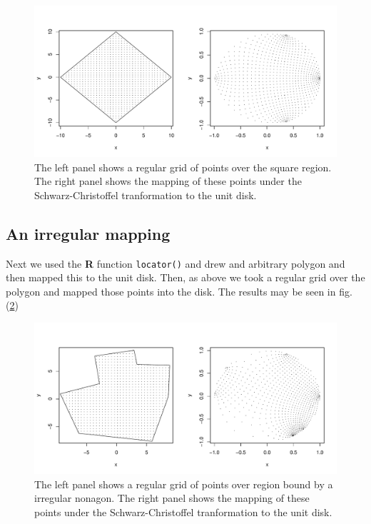 \documentclass[a4paper,10pt]{amsart}
\newcommand{\sch}{Schwarz-Christoffel }
\begin{document}
\begin{figure} [bp]
\centering
\includegraphics[scale=0.5]{figs/squaredomain.pdf}
\caption{The left panel shows a regular grid of points over the square region. The right panel shows the mapping of these points under the \sch tranformation to the unit disk.}
\label{squaredomain}
\end{figure}

\subsection{An irregular mapping}
Next we used the \textbf{R} function \texttt{locator()} and drew and arbitrary polygon and then mapped this to the unit disk. Then, as above we took a regular grid over the polygon and mapped those points into the disk. The results may be seen in fig. (\ref{irregdomain})


\begin{figure} [tbp]
\centering
\includegraphics[scale=0.5]{figs/irregulardomain.pdf}
\caption{The left panel shows a regular grid of points over region bound by a irregular nonagon. The right panel shows the mapping of these points under the \sch tranformation to the unit disk.}
\label{irregdomain}
\end{figure}
\end{document}

